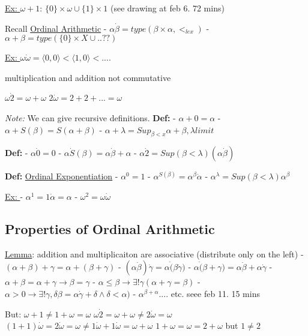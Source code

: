 \documentclass{article}
\newcommand{\set}[1]{\{#1\}}
\begin{document}
    \underline{Ex: } $\omega + 1$: $\{0\} \times \omega \cup \{1\}\times 1$ (see drawing at feb 6. 72 mins)

    Recall \underline{Ordinal Arithmetic}
    - $\alpha \dot \beta = type(\beta \times \alpha, <_{lex})$
    - $\alpha + \beta = type(\set{0} \times X \cup..??)$

    \underline{Ex: }
    $\omega \dot \omega = \langle 0,0 \rangle < \langle 1 , 0 \rangle < ....$

    multiplication and addition not commutative

    $\omega \dot 2 = \omega + \omega$
    $2 \dot \omega = 2 + 2 + ... = \omega$

    \emph{Note: } We can give recursive definitions.
    \textbf{Def: }
    - $\alpha + 0 = \alpha$
    - $\alpha + S(\beta) = S(\alpha + \beta)$
    - $\alpha + \lambda = Sup_{\beta < x} \alpha + \beta, \lambda limit$

    \textbf{Def: }
    - $\alpha \dot 0 = 0$
    - $\alpha \dot S(\beta) = \alpha \dot \beta + \alpha$
    - $\alpha \dot 2 = Sup(\beta < \lambda) (\alpha \dot \beta)$

    \textbf{Def: } \underline{Ordinal Exponentiation}
    - $\alpha^0 = 1$
    - $\alpha^{S(\beta)} = \alpha^\beta \dot \alpha$
    - $\alpha^\lambda = Sup(\beta < \lambda) \alpha^\beta$

    \underline{Ex: }
    - $\alpha^1 = 1 \dot \alpha = \alpha$
    - $\omega^2 = \omega \dot \omega$

    \subsection{Properties of Ordinal Arithmetic}
    \underline{Lemma}: addition and multiplicaiton are associative (distribute only on the left)
    - $(\alpha + \beta) + \gamma = \alpha + (\beta + \gamma)$
    - $(\alpha \dot \beta) \dot \gamma = \alpha \dot (\beta \dot \gamma)$
    - $\alpha \dot (\beta + \gamma) = \alpha \dot \beta + \alpha \dot \gamma$
    - $\alpha + \beta = \alpha + \gamma \rightarrow \beta = \gamma$
    - $\alpha \leq \beta \rightarrow \exists! \gamma (\alpha + \gamma = \beta)$
    - $\alpha > 0 \rightarrow \exists! \gamma, \delta \beta= \alpha \dot \gamma + \delta \wedge \delta < \alpha)$
    - $\alpha^{\beta + \alpha}$.... etc. seee feb 11. 15 mins

    But:
    $\omega + 1 \neq 1 + \omega = \omega$
    $\omega \dot 2 = \omega + \omega \neq 2 \dot \omega = \omega$
    $(1+1) \dot \omega = 2 \dot \omega = \omega \neq 1 \dot \omega + 1 \dot \omega = \omega + \omega$
    $1 + \omega = \omega = 2 + \omega$ but $1 \neq 2$
\end{document}
